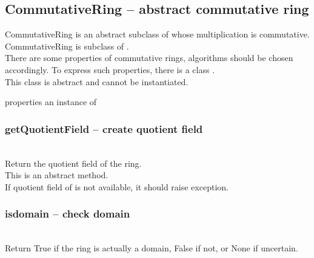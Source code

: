  \subsection{\negok CommutativeRing -- abstract commutative ring}
  \quad CommutativeRing is an abstract subclass of  whose multiplication is commutative.\\
  \spacing
  \quad CommutativeRing is subclass of .\\
  There are some properties of commutative rings, algorithms should be chosen accordingly. To express such properties, there is a class . 
  \\
  \spacing
  This class is abstract and cannot be instantiated.\\
  \begin{at}
    \item[properties] an instance of 
  \end{at}
  \method
  \subsubsection{getQuotientField -- create quotient field}
   \\
   \spacing
   \quad Return the quotient field of the ring.\\
   \spacing
   \quad This is an abstract method.\\
   If quotient field of  is not available, it should raise exception.
   \spacing
  \subsubsection{isdomain -- check domain}
   \\
   \spacing
   \quad Return True if the ring is actually a domain,
        False if not, or None if uncertain.\\
   \spacing
